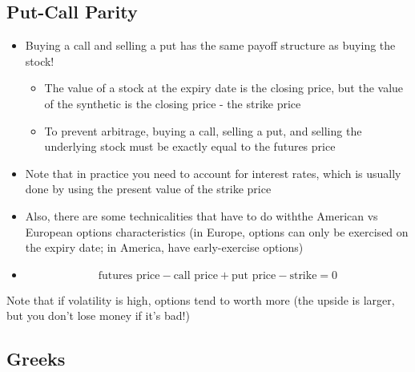 \subsection{Put-Call Parity}%
\label{sub:Put-Call Parity}
\begin{itemize}
    \item Buying a call and selling a put has the same payoff structure as buying the stock!
        \begin{itemize}
            \item The value of a stock at the expiry date is the closing price, but the value of the synthetic is the closing price - the strike price
            \item To prevent arbitrage, buying a call, selling a put, and selling the underlying stock must be exactly equal to the futures price
        \end{itemize}
    \item Note that in practice you need to account for interest rates, which is usually done by using the present value of the strike price
    \item Also, there are some technicalities that have to do withthe American vs European options characteristics (in Europe, options can only be exercised on the expiry date; in America, have early-exercise options)
    \item
        \begin{equation*}
            \text{futures price} - \text{call price} + \text{put price} - \text{strike} = 0
        \end{equation*}
        
\end{itemize}

\begin{remark}
    Note that if volatility is high, options tend to worth more (the upside is larger, but you don't lose money if it's bad!)
\end{remark}

\subsection{Greeks}%
\label{sub:Greeks}


